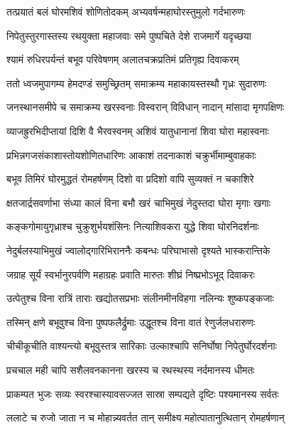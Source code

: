 
\twolineshloka
{तत्प्रयातं बलं घोरमशिवं शोणितोदकम्}
{अभ्यवर्षन्महाघोरस्तुमुलो गर्दभारुणः} %

\twolineshloka
{निपेतुस्तुरगास्तस्य रथयुक्ता महाजवाः}
{समे पुष्पचिते देशे राजमार्गे यदृच्छया} %

\twolineshloka
{श्यामं रुधिरपर्यन्तं बभूव परिवेषणम्}
{अलातचक्रप्रतिमं प्रतिगृह्य दिवाकरम्} %

\twolineshloka
{ततो ध्वजमुपागम्य हेमदण्डं समुच्छ्रितम्}
{समाक्रम्य महाकायस्तस्थौ गृध्रः सुदारुणः} %

\twolineshloka
{जनस्थानसमीपे च समाक्रम्य खरस्वनाः}
{विस्वरान् विविधान् नादान् मांसादा मृगपक्षिणः} %

\twolineshloka
{व्याजह्रुरभिदीप्तायां दिशि वै भैरवस्वनम्}
{अशिवं यातुधानानां शिवा घोरा महास्वनाः} %

\twolineshloka
{प्रभिन्नगजसंकाशास्तोयशोणितधारिणः}
{आकाशं तदनाकाशं चक्रुर्भीमाम्बुवाहकाः} %

\twolineshloka
{बभूव तिमिरं घोरमुद्धतं रोमहर्षणम्}
{दिशो वा प्रदिशो वापि सुव्यक्तं न चकाशिरे} %

\twolineshloka
{क्षतजार्द्रसवर्णाभा संध्या कालं विना बभौ}
{खरं चाभिमुखं नेदुस्तदा घोरा मृगाः खगाः} %

\twolineshloka
{कङ्कगोमायुगृध्राश्च चुक्रुशुर्भयशंसिनः}
{नित्याशिवकरा युद्धे शिवा घोरनिदर्शनाः} %

\twolineshloka
{नेदुर्बलस्याभिमुखं ज्वालोद्गारिभिराननैः}
{कबन्धः परिघाभासो दृश्यते भास्करान्तिके} %

\twolineshloka
{जग्राह सूर्यं स्वर्भानुरपर्वणि महाग्रहः}
{प्रवाति मारुतः शीघ्रं निष्प्रभोऽभूद् दिवाकरः} %

\twolineshloka
{उत्पेतुश्च विना रात्रिं ताराः खद्योतसप्रभाः}
{संलीनमीनविहगा नलिन्यः शुष्कपङ्कजाः} %

\twolineshloka
{तस्मिन् क्षणे बभूवुश्च विना पुष्पफलैर्द्रुमाः}
{उद्धूतश्च विना वातं रेणुर्जलधरारुणः} %

\twolineshloka
{चीचीकूचीति वाश्यन्त्यो बभूवुस्तत्र सारिकाः}
{उल्काश्चापि सनिर्घोषा निपेतुर्घोरदर्शनाः} %

\twolineshloka
{प्रचचाल मही चापि सशैलवनकानना}
{खरस्य च रथस्थस्य नर्दमानस्य धीमतः} %

\twolineshloka
{प्राकम्पत भुजः सव्यः स्वरश्चास्यावसज्जत}
{सास्रा सम्पद्यते दृष्टिः पश्यमानस्य सर्वतः} %

\twolineshloka
{ललाटे च रुजो जाता न च मोहान्न्यवर्तत}
{तान् समीक्ष्य महोत्पातानुत्थितान् रोमहर्षणान्} %

